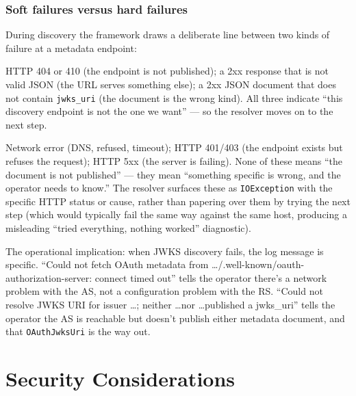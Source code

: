 \subsubsection*{Soft failures versus hard failures}

During discovery the framework draws a deliberate line between two kinds of failure at a metadata endpoint:

\begin{description}[style=nextline]
  \item[Soft failure --- fall through to the next step.]  HTTP 404 or 410 (the endpoint is not published); a 2xx response that is not valid JSON (the URL serves something else); a 2xx JSON document that does not contain \texttt{jwks\_uri} (the document is the wrong kind).  All three indicate ``this discovery endpoint is not the one we want'' --- so the resolver moves on to the next step.
  \item[Hard failure --- propagate.]  Network error (DNS, refused, timeout); HTTP 401/403 (the endpoint exists but refuses the request); HTTP 5xx (the server is failing).  None of these means ``the document is not published'' --- they mean ``something specific is wrong, and the operator needs to know.''  The resolver surfaces these as \texttt{IOException} with the specific HTTP status or cause, rather than papering over them by trying the next step (which would typically fail the same way against the same host, producing a misleading ``tried everything, nothing worked'' diagnostic).
\end{description}

The operational implication: when JWKS discovery fails, the log message is specific.  ``Could not fetch OAuth metadata from \dots /.well-known/oauth-authorization-server: connect timed out'' tells the operator there's a network problem with the AS, not a configuration problem with the RS.  ``Could not resolve JWKS URI for issuer \dots; neither \dots nor \dots published a jwks\_uri'' tells the operator the AS is reachable but doesn't publish either metadata document, and that \texttt{OAuthJwksUri} is the way out.

\section{Security Considerations}
\label{sec:oauth-security}

